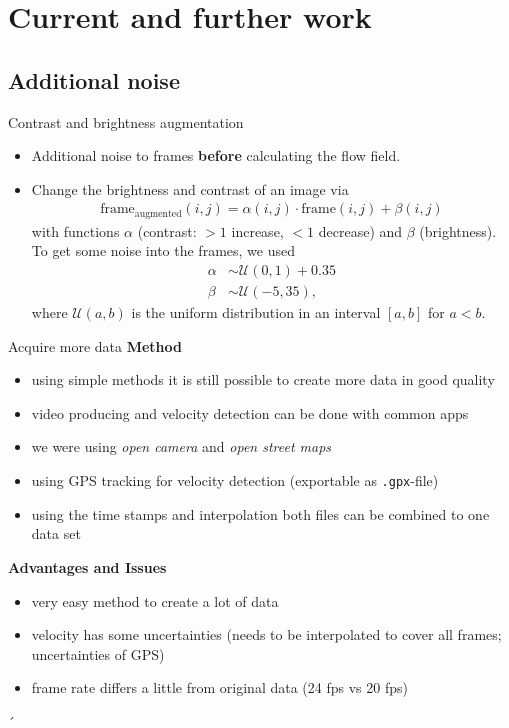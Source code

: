 \section{Current and further work}
\subsection{Additional noise}
\begin{frame}{Contrast and brightness augmentation}
\begin{itemize}
\item Additional noise to frames \textbf{before} calculating the flow field.
\item Change the brightness and contrast of an image via
\begin{align*}
\text{frame}_{\mathrm{augmented}}(i,j) = \alpha(i,j) \cdot \text{frame}(i,j) + \beta(i,j)
\end{align*}
with functions $\alpha$ (contrast: $>1$ increase, $<1$ decrease) and $\beta$ (brightness).\\
To get some noise into the frames, we used
\begin{align*}
\alpha &\sim \mathcal{U}(0,1)+0.35\\
\beta &\sim \mathcal{U}(-5,35),
\end{align*}
where $\mathcal{U}(a,b)$ is the uniform distribution in an interval $[a,b]$ for $a < b$.
\end{itemize}
\end{frame}

\begin{frame}{Acquire more data}
	\textbf{Method}
	\begin{itemize}
		\item using simple methods it is still possible to create more data in good quality
		\item video producing and velocity detection can be done with common apps
		\item we were using \textit{open camera} and \textit{open street maps}
		\item using GPS tracking for velocity detection (exportable as \texttt{.gpx}-file)
		\item using the time stamps and interpolation both files can be combined to one data set
	\end{itemize}
	\textbf{Advantages and Issues}
	\begin{itemize}
		\item very easy method to create a lot of data
		\item velocity has some uncertainties (needs to be interpolated to cover all frames; uncertainties of GPS)
		\item frame rate differs a little from original data (24 fps vs 20 fps)
	\end{itemize}´
\end{frame}

